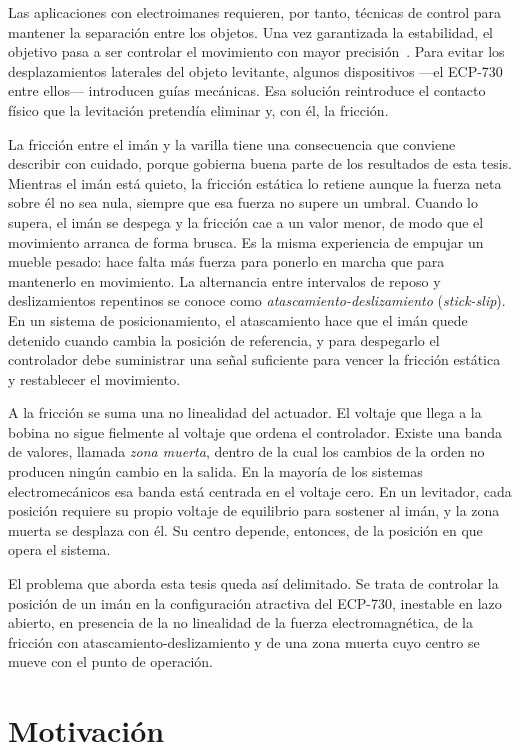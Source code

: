 Las aplicaciones con electroimanes requieren, por tanto, técnicas de control para mantener la separación entre los objetos. Una vez garantizada la estabilidad, el objetivo pasa a ser controlar el movimiento con mayor precisión~\cite{hyung}. Para evitar los desplazamientos laterales del objeto levitante, algunos dispositivos ---el ECP-730 entre ellos--- introducen guías mecánicas. Esa solución reintroduce el contacto físico que la levitación pretendía eliminar y, con él, la fricción.

La fricción entre el imán y la varilla tiene una consecuencia que conviene describir con cuidado, porque gobierna buena parte de los resultados de esta tesis. Mientras el imán está quieto, la fricción estática lo retiene aunque la fuerza neta sobre él no sea nula, siempre que esa fuerza no supere un umbral. Cuando lo supera, el imán se despega y la fricción cae a un valor menor, de modo que el movimiento arranca de forma brusca. Es la misma experiencia de empujar un mueble pesado: hace falta más fuerza para ponerlo en marcha que para mantenerlo en movimiento. La alternancia entre intervalos de reposo y deslizamientos repentinos se conoce como \emph{atascamiento-deslizamiento} (\emph{stick-slip}). En un sistema de posicionamiento, el atascamiento hace que el imán quede detenido cuando cambia la posición de referencia, y para despegarlo el controlador debe suministrar una señal suficiente para vencer la fricción estática y restablecer el movimiento.

A la fricción se suma una no linealidad del actuador. El voltaje que llega a la bobina no sigue fielmente al voltaje que ordena el controlador. Existe una banda de valores, llamada \emph{zona muerta}, dentro de la cual los cambios de la orden no producen ningún cambio en la salida. En la mayoría de los sistemas electromecánicos esa banda está centrada en el voltaje cero. En un levitador, cada posición requiere su propio voltaje de equilibrio para sostener al imán, y la zona muerta se desplaza con él. Su centro depende, entonces, de la posición en que opera el sistema.

El problema que aborda esta tesis queda así delimitado. Se trata de controlar la posición de un imán en la configuración atractiva del ECP-730, inestable en lazo abierto, en presencia de la no linealidad de la fuerza electromagnética, de la fricción con atascamiento-deslizamiento y de una zona muerta cuyo centro se mueve con el punto de operación.

\section{Motivación}

